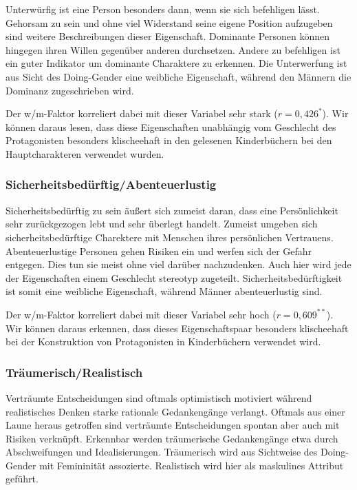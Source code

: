 Unterwürfig ist eine Person besonders dann, wenn sie sich befehligen
lässt. Gehorsam zu sein und ohne viel Widerstand seine eigene Position
aufzugeben sind weitere Beschreibungen dieser Eigenschaft. Dominante
Personen können hingegen ihren Willen gegenüber anderen durchsetzen.
Andere zu befehligen ist ein guter Indikator um dominante Charaktere zu
erkennen. Die Unterwerfung ist aus Sicht des Doing-Gender eine weibliche
Eigenschaft, während den Männern die Dominanz zugeschrieben wird.

Der w/m-Faktor korreliert dabei mit dieser Variabel sehr stark
($r= 0{,}426^*$). Wir können daraus lesen, dass diese Eigenschaften
unabhängig vom Geschlecht des Protagonisten besonders klischeehaft in
den gelesenen Kinderbüchern bei den Hauptcharakteren verwendet wurden.

\subsubsection{Sicherheitsbedürftig/Abenteuerlustig}

Sicherheitsbedürftig zu sein äußert sich zumeist daran, dass eine
Persönlichkeit sehr zurückgezogen lebt und sehr überlegt handelt.
Zumeist umgeben sich sicherheitsbedürftige Charektere mit Menschen ihres
persönlichen Vertrauens. Abenteuerlustige Personen gehen Risiken ein und
werfen sich der Gefahr entgegen. Dies tun sie meist ohne viel darüber
nachzudenken. Auch hier wird jede der Eigenschaften einem Geschlecht
stereotyp zugeteilt. Sicherheitsbedürftigkeit ist somit eine weibliche
Eigenschaft, während Männer abenteuerlustig sind.

Der w/m-Faktor korreliert dabei mit dieser Variabel sehr hoch
($r= 0{,}609^{**}$). Wir können daraus erkennen, dass dieses
Eigenschaftspaar besonders klischeehaft bei der Konstruktion von
Protagonisten in Kinderbüchern verwendet wird.

\subsubsection{Träumerisch/Realistisch}

Verträumte Entscheidungen sind oftmals optimistisch motiviert während
realistisches Denken starke rationale Gedankengänge verlangt. Oftmals
aus einer Laune heraus getroffen sind verträumte Entscheidungen spontan
aber auch mit Risiken verknüpft. Erkennbar werden träumerische
Gedankengänge etwa durch Abschweifungen und Idealisierungen. Träumerisch
wird aus Sichtweise des Doing-Gender mit Femininität assozierte.
Realistisch wird hier als maskulines Attribut geführt.

